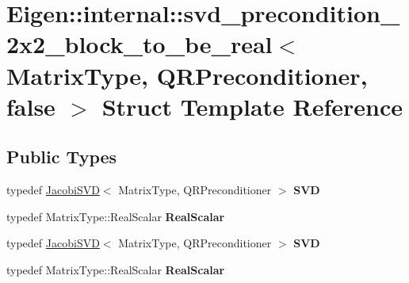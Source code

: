 \hypertarget{struct_eigen_1_1internal_1_1svd__precondition__2x2__block__to__be__real_3_01_matrix_type_00_01_q076cf26720930d18ea7d222bbee662fd}{}\section{Eigen\+:\+:internal\+:\+:svd\+\_\+precondition\+\_\+2x2\+\_\+block\+\_\+to\+\_\+be\+\_\+real$<$ Matrix\+Type, Q\+R\+Preconditioner, false $>$ Struct Template Reference}
\label{struct_eigen_1_1internal_1_1svd__precondition__2x2__block__to__be__real_3_01_matrix_type_00_01_q076cf26720930d18ea7d222bbee662fd}
\subsection*{Public Types}
\begin{DoxyCompactItemize}
\item 
\mbox{\label{struct_eigen_1_1internal_1_1svd__precondition__2x2__block__to__be__real_3_01_matrix_type_00_01_q076cf26720930d18ea7d222bbee662fd_a03f1047549bd0f97f40c2df3f4a14927}} 
typedef \hyperlink{group___s_v_d___module_class_eigen_1_1_jacobi_s_v_d}{Jacobi\+S\+VD}$<$ Matrix\+Type, Q\+R\+Preconditioner $>$ {\bfseries S\+VD}
\item 
\mbox{\label{struct_eigen_1_1internal_1_1svd__precondition__2x2__block__to__be__real_3_01_matrix_type_00_01_q076cf26720930d18ea7d222bbee662fd_a9256fcadaa3aa0e1ad3a5785dae44751}} 
typedef Matrix\+Type\+::\+Real\+Scalar {\bfseries Real\+Scalar}
\item 
\mbox{\label{struct_eigen_1_1internal_1_1svd__precondition__2x2__block__to__be__real_3_01_matrix_type_00_01_q076cf26720930d18ea7d222bbee662fd_a03f1047549bd0f97f40c2df3f4a14927}} 
typedef \hyperlink{group___s_v_d___module_class_eigen_1_1_jacobi_s_v_d}{Jacobi\+S\+VD}$<$ Matrix\+Type, Q\+R\+Preconditioner $>$ {\bfseries S\+VD}
\item 
\mbox{\label{struct_eigen_1_1internal_1_1svd__precondition__2x2__block__to__be__real_3_01_matrix_type_00_01_q076cf26720930d18ea7d222bbee662fd_a9256fcadaa3aa0e1ad3a5785dae44751}} 
typedef Matrix\+Type\+::\+Real\+Scalar {\bfseries Real\+Scalar}
\end{DoxyCompactItemize}
